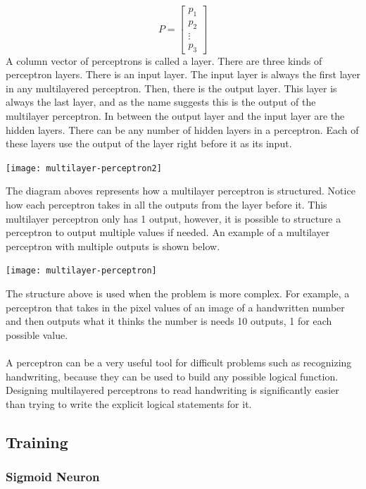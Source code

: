 $$
	P = \begin{bmatrix}
		p_1 \\
		p_2 \\
		\vdots \\
		p_3
	\end{bmatrix}
$$
A column vector of perceptrons is called a layer. There are three kinds of perceptron layers. There is an input layer. The input layer is always the first layer in any multilayered perceptron. Then, there is the output layer. This layer is always the last layer, and as the name suggests this is the output of the multilayer perceptron. In between the output layer and the input layer are the hidden layers. There can be any number of hidden layers in a perceptron. Each of these layers use the output of the layer right before it as its input.

\begin{center}
	\texttt{[image: multilayer-perceptron2]}
\end{center}
\cite{image1}
The diagram aboves represents how a multilayer perceptron is structured. Notice how each perceptron takes in all the outputs from the layer before it. This multilayer perceptron only has 1 output, however, it is possible to structure a perceptron to output multiple values if needed. An example of a multilayer perceptron with multiple outputs is shown below.

\begin{center}
	\texttt{[image: multilayer-perceptron]}
\end{center}
\cite{image2}
The structure above is used when the problem is more complex. For example, a perceptron that takes in the pixel values of an image of a handwritten number and then outputs what it thinks the number is needs 10 outputs, 1 for each possible value. \\ \\
A perceptron can be a very useful tool for difficult problems such as recognizing handwriting, because they can be used to build any possible logical function. Designing multilayered perceptrons to read handwriting is significantly easier than trying to write the explicit logical statements for it.

\subsection{Training}

\subsubsection{Sigmoid Neuron}

